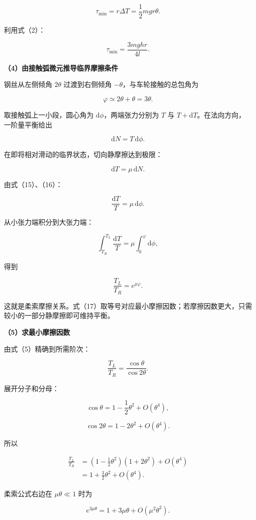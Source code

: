 \documentclass[12pt,a4paper,UTF8]{ctexart}
\begin{document}
\[
\tau_{\min}=r\Delta T
=\frac12mgr\theta.
\]

利用式（2）：

\[
\boxed{
\tau_{\min}
=\frac{3mghr}{4l}
}.
\tag{13}
\]

\textbf{（4）由接触弧微元推导临界摩擦条件}

钢丝从左侧倾角 \(2\theta\) 过渡到右侧倾角
\(-\theta\)，与车轮接触的总包角为

\[
\varphi\simeq2\theta+\theta=3\theta.
\tag{14}
\]

取接触弧上一小段，圆心角为 \(\mathrm d\phi\)，两端张力分别为 \(T\) 与
\(T+\mathrm dT\)。在法向方向，一阶量平衡给出

\[
\mathrm dN=T\,\mathrm d\phi.
\tag{15}
\]

在即将相对滑动的临界状态，切向静摩擦达到极限：

\[
\mathrm dT=\mu\,\mathrm dN.
\tag{16}
\]

由式（15）、（16）：

\[
\frac{\mathrm dT}{T}=\mu\,\mathrm d\phi.
\]

从小张力端积分到大张力端：

\[
\int_{T_R}^{T_L}\frac{\mathrm dT}{T}
=\mu\int_0^{\varphi}\mathrm d\phi,
\]

得到

\[
\boxed{\frac{T_L}{T_R}=e^{\mu\varphi}}.
\tag{17}
\]

这就是柔索摩擦关系。式（17）取等号对应最小摩擦因数；若摩擦因数更大，只需较小的一部分静摩擦即可维持平衡。

\textbf{（5）求最小摩擦因数}

由式（5）精确到所需阶次：

\[
\frac{T_L}{T_R}
=\frac{\cos\theta}{\cos2\theta}.
\tag{18}
\]

展开分子和分母：

\[
\cos\theta=1-\frac12\theta^2+O(\theta^4),
\]

\[
\cos2\theta=1-2\theta^2+O(\theta^4).
\]

所以

\[
\begin{aligned}
\frac{T_L}{T_R}
&=\left(1-\frac12\theta^2\right)
\left(1+2\theta^2\right)+O(\theta^4)\\
&=1+\frac32\theta^2+O(\theta^4).
\end{aligned}
\tag{19}
\]

柔索公式右边在 \(\mu\theta\ll1\) 时为

\[
e^{3\mu\theta}
=1+3\mu\theta+O(\mu^2\theta^2).
\tag{20}
\]
\end{document}
